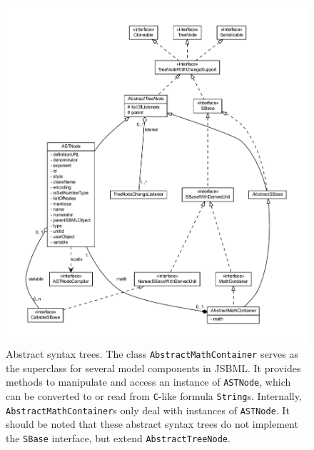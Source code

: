 \begin{figure}[p]
 \centering
 \includegraphics[width=.8\textwidth]{img/ASTNode.pdf}
 \caption[Abstract syntax trees]{Abstract syntax trees. The class
 \texttt{AbstractMathContainer} serves as the superclass for several model
 components in JSBML. It provides methods to manipulate and access an instance 
 of \texttt{ASTNode}, which can be converted to or read from \texttt{C}-like
 formula \texttt{String}s. Internally, \texttt{AbstractMathContainer}s only
 deal with instances of \texttt{ASTNode}. It should be noted that these
 abstract syntax trees do not implement the \texttt{SBase} interface, but
 extend \texttt{AbstractTreeNode}.}
 \label{fig:MathContainer}
\end{figure}
